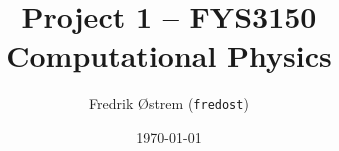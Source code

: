 \documentclass[11pt,a4paper]{article}
\begin{document}
\title{Project 1 -- FYS3150 Computational Physics}
\author{Fredrik Østrem (\texttt{fredost})}
\date{\today}

\maketitle
\end{document}
